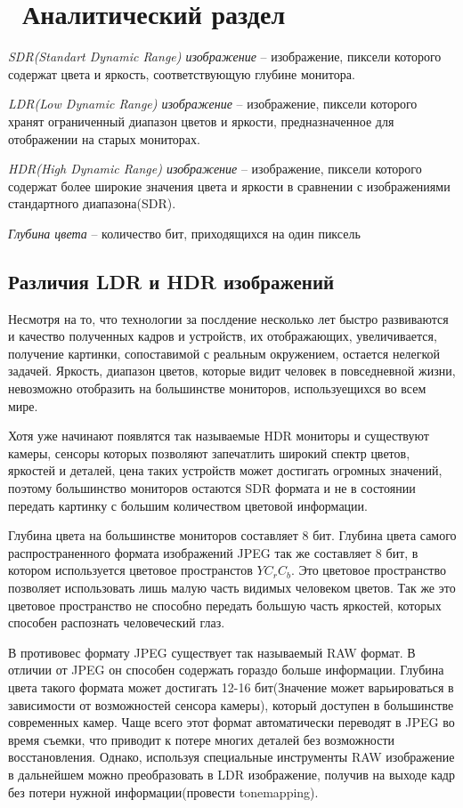 \chapter{ Аналитический раздел}
\label{cha:analysis}

\textit{SDR(Standart Dynamic Range) изображение} -- изображение, пиксели которого содержат цвета и яркость, соответствующую глубине монитора.

\textit{LDR(Low Dynamic Range) изображение} -- изображение, пиксели которого хранят ограниченный диапазон цветов и яркости, предназначенное для отображении на старых мониторах.

\textit{HDR(High Dynamic Range) изображение} -- изображение, пиксели которого содержат более широкие значения цвета и яркости в сравнении с изображениями стандартного диапазона(SDR).

\textit{Глубина цвета} -- количество бит, приходящихся на один пиксель 

\section{ Различия LDR и HDR изображений}
    
    Несмотря на то, что технологии за послдение несколько лет быстро развиваются и качество полученных кадров и устройств, их отображающих, увеличивается, получение картинки, сопоставимой с реальным окружением, остается нелегкой задачей. Яркость, диапазон цветов, которые видит человек в повседневной жизни, невозможно отобразить на большинстве мониторов, используещихся во всем мире. 

    Хотя уже начинают появлятся так называемые HDR мониторы и существуют камеры, сенсоры которых позволяют запечатлить широкий спектр цветов, яркостей и деталей, цена таких устройств может достигать огромных значений, поэтому большинство мониторов остаются SDR формата и не в состоянии передать картинку с большим количеством цветовой информации.

    Глубина цвета на большинстве мониторов составляет 8 бит. Глубина цвета самого распространенного формата изображений JPEG так же составляет 8 бит, в котором используется цветовое пространстов $YC_rC_b$. Это цветовое пространство позволяет использовать лишь малую часть видимых человеком цветов. Так же это цветовое пространство не способно передать большую часть яркостей, которых способен распознать человеческий глаз.

    В противовес формату JPEG существует так называемый RAW формат. В отличии от JPEG он способен содержать гораздо больше информации. Глубина цвета такого формата может достигать 12-16 бит(Значение может варьироваться в зависимости от возможностей сенсора камеры), который доступен в большинстве современных камер. Чаще всего этот формат автоматически переводят в JPEG во время съемки, что приводит к потере многих деталей без возможности восстановления. Однако, используя специальные инструменты RAW изображение в дальнейшем можно преобразовать в LDR изображение, получив на выходе кадр без потери нужной информации(провести tonemapping).

